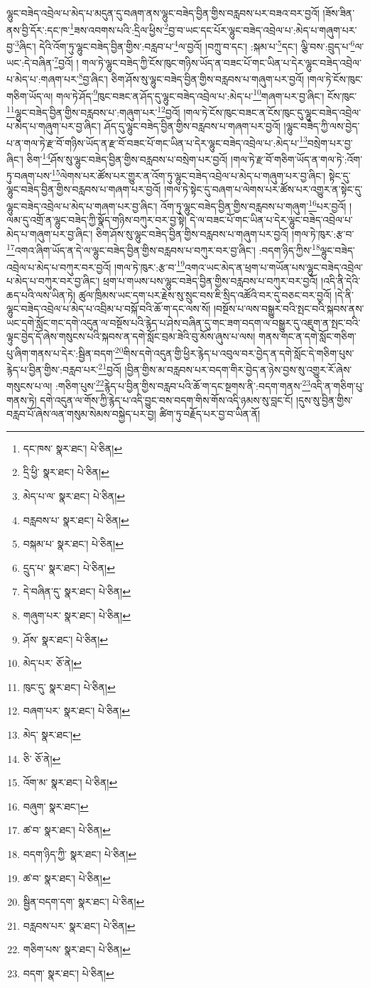 ལྷུང་བཟེད་འབྲེལ་པ་མེད་པ་མདུན་དུ་བཞག་ནས་ལྷུང་བཟེད་བྱིན་གྱིས་བརླབས་པར་བཟའ་བར་བྱའོ། །ཟོས་ཟིན་ནས་བྱི་དོར་:དང་ཁ་\footnote{དང་ཁས་  སྣར་ཐང་།  པེ་ཅིན། }ཟས་འབགས་པའི་:དྲིལ་ཕྱིས་\footnote{དྲི་ཕྱི་  སྣར་ཐང་།  པེ་ཅིན། }བྱ་བ་ཡང་དང་པོར་ལྷུང་བཟེད་འབྲེལ་པ་:མེད་པ་གཞུག་པར་བྱ་\footnote{མེད་པ་ལ་  སྣར་ཐང་།  པེ་ཅིན། }ཞིང་། དེའི་འོག་ཏུ་ལྷུང་བཟེད་བྱིན་གྱིས་:བརླབ་པ་\footnote{བརླབས་པ་  སྣར་ཐང་།  པེ་ཅིན། }ལ་བྱའོ། །བཀྲུ་བ་དང་། :སྐམ་པ་\footnote{བསྐམ་པ་  སྣར་ཐང་།  པེ་ཅིན། }དང་། ལྕི་བས་:བྲུད་པ་\footnote{དྲུད་པ་  སྣར་ཐང་།  པེ་ཅིན། }ལ་ཡང་:དེ་བཞིན་\footnote{དེ་བཞིན་དུ་  སྣར་ཐང་།  པེ་ཅིན། }བྱའོ། །
གལ་ཏེ་ལྷུང་བཟེད་ཀྱི་ངོས་ཁུང་གཉིས་ཡོད་ན་བཟང་པོ་གང་ཡིན་པ་དེར་ལྷུང་བཟེད་འབྲེལ་པ་མེད་པ་:གཞག་པར་\footnote{གཞུག་པར་  སྣར་ཐང་།  པེ་ཅིན། }བྱ་ཞིང་། ཅིག་ཤོས་སུ་ལྷུང་བཟེད་བྱིན་གྱིས་བརླབས་པ་གཞུག་པར་བྱའོ། །གལ་ཏེ་ངོས་ཁུང་གཅིག་ཡོད་ལ། གལ་ཏེ་ཤོད་\footnote{ཤོས་  སྣར་ཐང་།  པེ་ཅིན། }ཁུང་བཟང་ན་ཤོད་དུ་ལྷུང་བཟེད་འབྲེལ་པ་:མེད་པ་\footnote{མེད་པར་  ཅོ་ནེ། }གཞག་པར་བྱ་ཞིང་། ངོས་ཁུང་\footnote{ཁུང་དུ་  སྣར་ཐང་།  པེ་ཅིན། }ལྷུང་བཟེད་བྱིན་གྱིས་བརླབས་པ་:གཞུག་པར་\footnote{བཞག་པར་  སྣར་ཐང་།  པེ་ཅིན། }བྱའོ། །གལ་ཏེ་ངོས་ཁུང་བཟང་ན་ངོས་ཁུང་དུ་ལྷུང་བཟེད་འབྲེལ་པ་མེད་པ་གཞུག་པར་བྱ་ཞིང་། ཤོད་དུ་ལྷུང་བཟེད་བྱིན་གྱིས་བརླབས་པ་གཞག་པར་བྱའོ། །ལྷུང་བཟེད་ཀྱི་ལས་བྱེད་པ་ན་གལ་ཏེ་རྫ་བོ་གཉིས་ཡོད་ན་རྫ་བོ་བཟང་པོ་གང་ཡིན་པ་དེར་ལྷུང་བཟེད་འབྲེལ་པ་:མེད་པ་\footnote{མེད་  སྣར་ཐང་། }བསྲེག་པར་བྱ་ཞིང་། ཅིག་\footnote{ཅི་  ཅོ་ནེ། }ཤོས་སུ་ལྷུང་བཟེད་བྱིན་གྱིས་བརླབས་པ་བསྲེག་པར་བྱའོ། །གལ་ཏེ་རྫ་བོ་གཅིག་ཡོད་ན་གལ་ཏེ་:འོག་ཏུ་བཞག་པས་\footnote{འོག་མ་  སྣར་ཐང་།  པེ་ཅིན། }ལེགས་པར་ཚོས་པར་གྱུར་ན་འོག་ཏུ་ལྷུང་བཟེད་འབྲེལ་པ་མེད་པ་གཞུག་པར་བྱ་ཞིང་། སྟེང་དུ་ལྷུང་བཟེད་བྱིན་གྱིས་བརླབས་པ་གཞག་པར་བྱའོ། །གལ་ཏེ་སྟེང་དུ་བཞག་པ་ལེགས་པར་ཚོས་པར་འགྱུར་ན་སྟེང་དུ་ལྷུང་བཟེད་འབྲེལ་པ་མེད་པ་གཞག་པར་བྱ་ཞིང་། འོག་ཏུ་ལྷུང་བཟེད་བྱིན་གྱིས་བརླབས་པ་གཞུག་\footnote{བཞུག་  སྣར་ཐང་། }པར་བྱའོ། །ལམ་དུ་འགྲོ་ན་ལྷུང་བཟེད་ཀྱི་སྣོད་གཉིས་བཀུར་བར་བྱ་སྟེ། དེ་ལ་བཟང་པོ་གང་ཡིན་པ་དེར་ལྷུང་བཟེད་འབྲེལ་པ་མེད་པ་གཞུག་པར་བྱ་ཞིང་། ཅིག་ཤོས་སུ་ལྷུང་བཟེད་བྱིན་གྱིས་བརླབས་པ་གཞུག་པར་བྱའོ། །གལ་ཏེ་ཁུར་:རྩ་བ་\footnote{ཚ་བ་  སྣར་ཐང་།  པེ་ཅིན། }འགའ་ཞིག་ཡོད་ན་དེ་ལ་ལྷུང་བཟེད་བྱིན་གྱིས་བརླབས་པ་བཀུར་བར་བྱ་ཞིང་། :བདག་ཉིད་ཀྱིས་\footnote{བདག་ཉིད་ཀྱི་  སྣར་ཐང་།  པེ་ཅིན། }ལྷུང་བཟེད་འབྲེལ་པ་མེད་པ་བཀུར་བར་བྱའོ། །གལ་ཏེ་ཁུར་:རྩ་བ་\footnote{ཚ་བ་  སྣར་ཐང་།  པེ་ཅིན། }འགའ་ཡང་མེད་ན་ཕྲག་པ་གཡོན་པས་ལྷུང་བཟེད་འབྲེལ་པ་མེད་པ་བཀུར་བར་བྱ་ཞིང་། ཕྲག་པ་གཡས་པས་ལྷུང་བཟེད་བྱིན་གྱིས་བརླབས་པ་བཀུར་བར་བྱའོ། །འདི་ནི་དེའི་ཆད་པའི་ལས་ཡིན་ཏེ། ཚུལ་ཁྲིམས་ཡང་དག་པར་རྗེས་སུ་སྲུང་བས་ཇི་སྲིད་འཚོའི་བར་དུ་བཅང་བར་བྱའོ། །དེ་ནི་ལྷུང་བཟེད་འབྲེལ་པ་མེད་པ་འབྲིམ་པ་བསྐོ་བའི་ཆོ་ག་དང་ལས་སོ། །བསྔོས་པ་ལས་བསྒྱུར་བའི་སྤང་བའི་སྐབས་ནས་ཡང་དགེ་སློང་གང་དགེ་འདུན་ལ་བསྔོས་པའི་རྙེད་པ་ཤེས་བཞིན་དུ་གང་ཟག་བདག་ལ་བསྒྱུར་དུ་འཇུག་ན་སྤང་བའི་ལྟུང་བྱེད་དོ་ཞེས་གསུངས་པའི་སྐབས་ན་དགེ་སློང་བྲམ་ཟེའི་བུ་མོས་ཞུས་པ་ལས། གནས་གང་ན་དགེ་སློང་གཅིག་པུ་ཞིག་གནས་པ་དེར་:སྦྱིན་བདག་\footnote{སྦྱིན་བདག་དག་  སྣར་ཐང་།  པེ་ཅིན། }གིས་དགེ་འདུན་གྱི་ཕྱིར་རྙེད་པ་འབུལ་བར་བྱེད་ན་དགེ་སློང་དེ་གཅིག་པུས་རྙེད་པ་བྱིན་གྱིས་:བརླབ་པར་\footnote{བརླབས་པར་  སྣར་ཐང་།  པེ་ཅིན། }བྱའོ། །བྱིན་གྱིས་མ་བརླབས་པར་བདག་གིར་བྱེད་ན་ཉེས་བྱས་སུ་འགྱུར་རོ་ཞེས་གསུངས་པ་ལ། :གཅིག་པུས་\footnote{གཅིག་པས་  སྣར་ཐང་།  པེ་ཅིན། }རྙེད་པ་བྱིན་གྱིས་བརླབ་པའི་ཆོ་ག་དང་སྔགས་ནི་:བདག་གནས་\footnote{བདག་  སྣར་ཐང་།  པེ་ཅིན། }འདི་ན་གཅིག་པུ་གནས་ཏེ། དགེ་འདུན་ལ་གོས་ཀྱི་རྙེད་པ་འདི་བྱུང་བས་བདག་གིས་གོས་འདི་ཉམས་སུ་བླང་ངོ། །དུས་སུ་བྱིན་གྱིས་བརླབ་པོ་ཞེས་ལན་གསུམ་སེམས་བསྐྱེད་པར་བྱ། ཚིག་ཏུ་བརྗོད་པར་བྱ་བ་ཡིན་ནོ། 